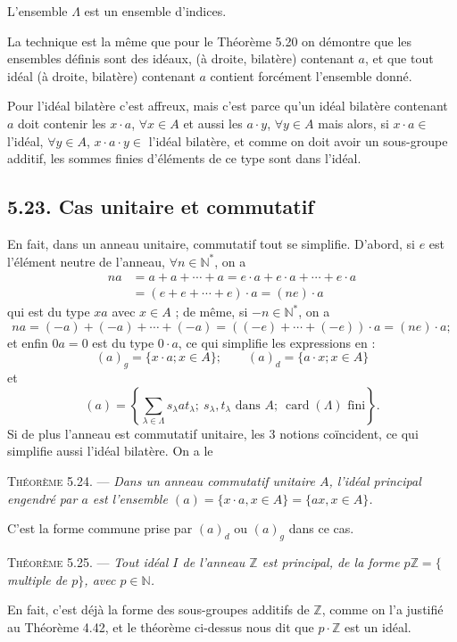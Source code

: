 L'ensemble $\Lambda$ est un ensemble d'indices.

La technique est la même que pour le Théorème 5.20 on démontre que les ensembles définis sont des idéaux, (à droite, bilatère) contenant $a$, et que tout idéal (à droite, bilatère) contenant $a$ contient forcément l'ensemble donné.

Pour l'idéal bilatère c'est affreux, mais c'est parce qu'un idéal bilatère contenant $a$ doit contenir les $x\cdot a$, $\forall x\in A$ et aussi les $a\cdot y$, $\forall y\in A$ mais alors, si $x\cdot a\in$ l'idéal, $\forall y\in A$, $x\cdot a\cdot y\in$ l'idéal bilatère, et comme on doit avoir un sous-groupe additif, les sommes finies d'éléments de ce type sont dans l'idéal. \bookend

\subsection*{5.23. Cas unitaire et commutatif}
En fait, dans un anneau unitaire, commutatif tout se simplifie. D'abord, si $e$ est l'élément neutre de l'anneau, $\forall n\in\mathbb N^*$, on a
\begin{align*}
na&=a+a+\cdots+a=e\cdot a+e\cdot a+\cdots+e\cdot a\\
&=(e+e+\cdots+e)\cdot a=(ne)\cdot a
\end{align*}
qui est du type $xa$ avec $x\in A$ ; de même, si $-n\in\mathbb N^*$, on a
\[
na=(-a)+(-a)+\cdots+(-a)=((-e)+\cdots+(-e))\cdot a=(ne)\cdot a;
\]
et enfin $0a=0$ est du type $0\cdot a$, ce qui simplifie les expressions en :
\[
(a)_g=\{x\cdot a;x\in A\};\qquad(a)_d=\{a\cdot x;x\in A\}
\]
et
\[
(a)=\left\{\sum_{\lambda\in\Lambda}s_\lambda a t_\lambda;\ s_\lambda,t_\lambda\text{ dans }A;\ \operatorname{card}(\Lambda)\text{ fini}\right\}.
\]
Si de plus l'anneau est commutatif unitaire, les 3 notions coïncident, ce qui simplifie aussi l'idéal bilatère. On a le

\medskip\noindent\textsc{Théorème 5.24.} --- \emph{Dans un anneau commutatif unitaire $A$, l'idéal principal engendré par $a$ est l'ensemble $(a)=\{x\cdot a,x\in A\}=\{ax,x\in A\}$.}

C'est la forme commune prise par $(a)_d$ ou $(a)_g$ dans ce cas. \bookend

\medskip\noindent\textsc{Théorème 5.25.} --- \emph{Tout idéal $I$ de l'anneau $\mathbb Z$ est principal, de la forme $p\mathbb Z=\{$multiple de $p\}$, avec $p\in\mathbb N$.}

En fait, c'est déjà la forme des sous-groupes additifs de $\mathbb Z$, comme on l'a justifié au Théorème 4.42, et le théorème ci-dessus nous dit que $p\cdot\mathbb Z$ est un idéal. \bookend

